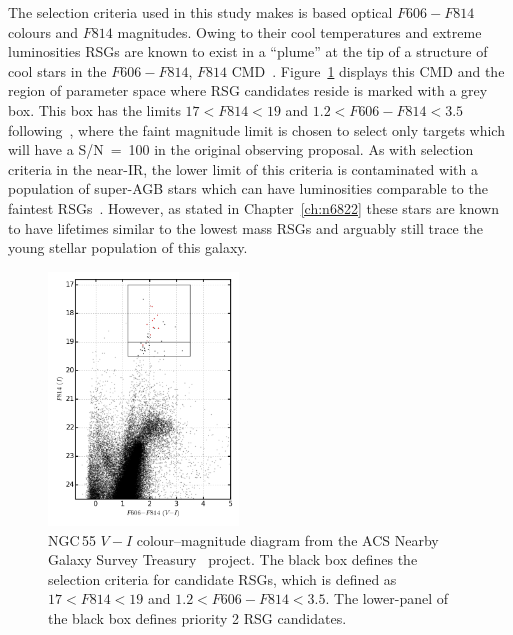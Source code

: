 The selection criteria used in this study makes is based optical $F606-F814$ colours and $F814$ magnitudes.
Owing to their cool temperatures and extreme luminosities RSGs are known to exist in a ``plume'' at the tip of a structure of cool stars in the $F606-F814$, $F814$ CMD~\citep[e.g.][]{2015ApJ...805..182G}.
Figure~\ref{fig:VI} displays this CMD and the region of parameter space where RSG candidates reside is marked with a grey box.
This box has the limits $17 < F814 < 19$ and $1.2 < F606-F814 < 3.5$ following~\cite{2015ApJ...805..182G}, where the faint magnitude limit is chosen to select only targets which will have a S/N~=~100 in the original observing proposal.
As with selection criteria in the near-IR, the lower limit of this criteria is contaminated with a population of super-AGB stars which can have luminosities comparable to the faintest RSGs~\citep[e.g.][]{2000ApJ...542..804N}.
However, as stated in Chapter~\ref{ch:n6822} these stars are known to have lifetimes similar to the lowest mass RSGs and arguably still trace the young stellar population of this galaxy.

\begin{figure}
  \centering
  \includegraphics[width=0.45\textwidth]{ngc55/ngc55-v_i_angst}
 \caption[NGC\,55 $V-I$ colour--magnitude diagram]{
  NGC\,55 $V-I$ colour--magnitude diagram from the ACS Nearby Galaxy Survey Treasury~\citep[ANGST][]{2009ApJS..183...67D} project.
  The black box defines the selection criteria for candidate RSGs, which is defined as $17 < F814 < 19$ and $1.2 < F606-F814 < 3.5$.
  The lower-panel of the black box defines priority 2 RSG candidates.
          }
 \label{fig:VI}
\end{figure}


